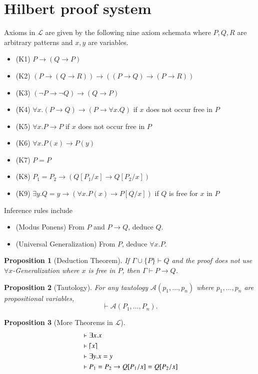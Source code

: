 \documentclass{article}
\newtheorem{prop}{Proposition}
\DeclarePairedDelimiter\ceil{\lceil}{\rceil}
\begin{document}
\section{Hilbert proof system}
Axioms in $\mathcal{L}$ are given by the following nine axiom schemata where $P, Q, R$ are arbitrary patterns and $x, y$ are variables.
\begin{itemize}
\item (K1) $P \to (Q \to P)$
\item (K2) $(P \to (Q \to R)) \to ((P \to Q) \to (P \to R))$
\item (K3) $(\neg P \to \neg Q) \to (Q \to P)$
\item (K4) $\forall x . (P \to Q) \to (P \to \forall x . Q)$ if $x$ does not occur free in $P$
\item (K5) $\forall x . P \to P$ if $x$ does not occur free in $P$
\item (K6) $\forall x . P(x) \to P(y)$
\item (K7) $P = P$
\item (K8) $P_1 = P_2 \to (Q[P_1/x] \to Q[P_2/x])$
\item (K9) $\exists y . Q = y \to (\forall x . P(x) \to P[Q/x])$ if $Q$ is free for $x$ in $P$
\end{itemize}

Inference rules include
\begin{itemize}
\item (Modus Ponens) From $P$ and $P \to Q$, deduce $Q$.
\item (Universal Generalization) From $P$, deduce $\forall x . P$. 
\end{itemize}

\begin{prop}[Deduction Theorem]
If $\Gamma \cup \{P\} \vdash Q$ and the proof does not use \mbox{$\forall x$-Generalization} where $x$ is free in $P$, then $\Gamma \vdash P \to Q$. 
\end{prop}

\begin{prop}[Tautology]
For any tautology $\mathcal{A}(p_1,\dots,p_n)$ where $p_1,\dots,p_n$ are propositional variables, $$ \vdash \mathcal{A}(P_1,\dots,P_n).$$
\end{prop}

\begin{prop}[More Theorems in $\mathcal{L}$]
\begin{align*}
&\vdash \exists x . x \\
&\vdash \ceil*{x} \\
&\vdash \exists y . x = y \\
&\vdash P_1 = P_2 \to Q[P_1 / x] = Q[P_2 / x]
\end{align*}
\end{prop}
\end{document}

